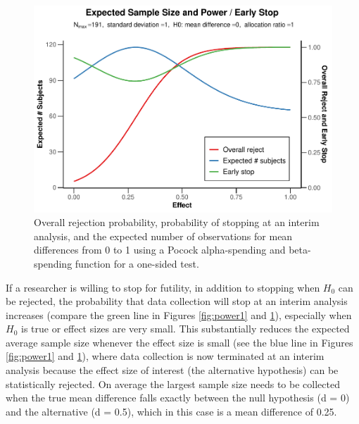 \documentclass[
  english,
  ,jou, a4paper,floatsintext]{apa6}
\begin{document}
\begin{figure}
\centering
\includegraphics{sequential_tutorial_files/figure-latex/power2-1.pdf}
\caption{\label{fig:power2}Overall rejection probability, probability of stopping at an interim analysis, and the expected number of observations for mean differences from 0 to 1 using a Pocock alpha-spending and beta-spending function for a one-sided test.}
\end{figure}

If a researcher is willing to stop for futility, in addition to stopping when \(H_0\) can be rejected, the probability that data collection will stop at an interim analysis increases (compare the green line in Figures \ref{fig:power1} and \ref{fig:power2}), especially when \(H_0\) is true or effect sizes are very small. This substantially reduces the expected average sample size whenever the effect size is small (see the blue line in Figures \ref{fig:power1} and \ref{fig:power2}), where data collection is now terminated at an interim analysis because the effect size of interest (the alternative hypothesis) can be statistically rejected. On average the largest sample size needs to be collected when the true mean difference falls exactly between the null hypothesis (d = 0) and the alternative (d = 0.5), which in this case is a mean difference of 0.25.
\end{document}
